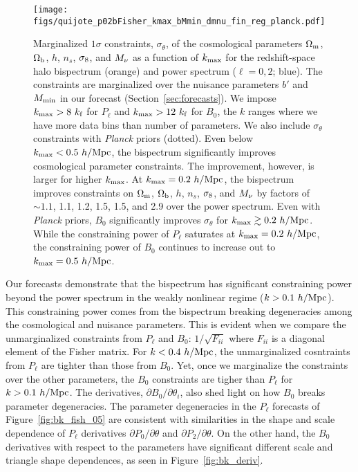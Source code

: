 \begin{figure}
\begin{center}
    \texttt{[image: figs/quijote\_p02bFisher\_kmax\_bMmin\_dmnu\_fin\_reg\_planck.pdf]} 
    \caption{Marginalized $1\sigma$ constraints, $\sigma_\theta$, of the cosmological 
    parameters $\Omega_{\rm m}$, $\Omega_{\rm b}$, $h$, $n_s$, $\sigma_8$, and $M_\nu$ as a function 
    of $k_{\rm max}$ for the redshift-space halo bispectrum (orange) and power 
    spectrum ($\ell = 0, 2$; blue). The constraints are marginalized over the nuisance parameters 
    $b'$ and $M_{\rm min}$ in our forecast (Section~\ref{sec:forecasts}). We impose 
    $k_{\rm max} > 8~k_{\rm f}$ for $P_\ell$ and $k_{\rm max} > 12~k_{\rm f}$ 
    for $B_0$, the $k$ ranges where we have more data bins than number of parameters. 
    We also include $\sigma_\theta$ constraints with {\em Planck} priors (dotted). 
    Even below $k_{\rm max} < 0.5~h/{\rm Mpc}$, the bispectrum significantly 
    improves cosmological parameter constraints. The improvement, however, is larger 
    for higher $k_{\rm max}$. At $k_{\rm max} = 0.2~h/{\rm Mpc}$, the bispectrum 
    improves constraints on $\Omega_{\rm m}$, $\Omega_{\rm b}$, $h$, $n_s$, $\sigma_8$, and $M_\nu$ by factors 
    of $\sim 1.1$, 1.1, 1.2, 1.5, 1.5, and 2.9 over the power spectrum. Even with 
    {\em Planck} priors, $B_0$ significantly improves $\sigma_\theta$ for $k_{\rm max} \gtrsim 0.2~h/{\rm Mpc}$. 
    While the constraining power of $P_\ell$ saturates at $k_{\rm max} = 0.2~h/{\rm Mpc}$,
    the constraining power of $B_0$ continues to increase out to $k_{\rm max} = 0.5~h/{\rm Mpc}$.}
\label{fig:fish_kmax}
\end{center}
\end{figure}
Our forecasts demonstrate that the bispectrum has significant constraining power 
beyond the power spectrum in the weakly nonlinear regime ($k > 0.1~h/{\rm Mpc}$). 
This constraining power 
comes from the bispectrum breaking degeneracies among the cosmological and 
nuisance parameters. This is evident when we compare the unmarginalized 
constraints from $P_\ell$ and $B_0$: $1/\sqrt{F_{ii}}$ where $F_{ii}$ is a 
diagonal element of the Fisher matrix. For $k < 0.4~h/{\rm Mpc}$, the unmarginalized 
cosntraints from $P_\ell$ are tighter than those from $B_0$. Yet, once we 
marginalize the constraints over the other parameters, the $B_0$ constraints 
are tigher than $P_\ell$ for $k > 0.1~h/{\rm Mpc}$. The derivatives, 
$\partial B_0/\partial \theta_i$, also shed light on how $B_0$ breaks parameter 
degeneracies. The parameter degeneracies in the $P_\ell$ forecasts of Figure~\ref{fig:bk_fish_05} 
are consistent with similarities in the shape and scale dependence of 
$P_\ell$ derivatives $\partial P_0/\partial \theta$ and $\partial P_2/\partial \theta$. 
On the other hand, the $B_0$ derivatives with respect to the parameters 
have significant different scale and triangle shape dependences, as seen 
in Figure~\ref{fig:bk_deriv}.

